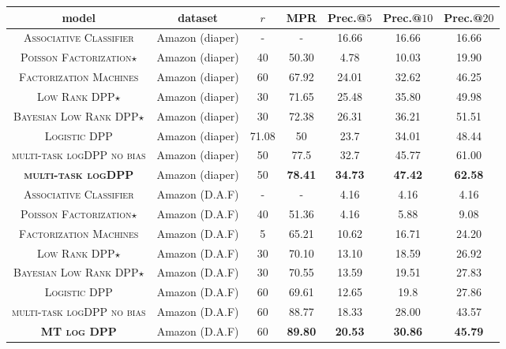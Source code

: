 \begin{table*}
\begin{center}
\begin{tabular}{ccccccc}
\hline
model & dataset & $r$ & MPR & Prec.@$5$ & Prec.@$10$ & Prec.@$20$ \\ \hline
\textsc{Associative Classifier} & Amazon (diaper) & - & - & 16.66 & 16.66 & 16.66 \\
\textsc{Poisson Factorization}$\star$ & Amazon (diaper) & 40 & 50.30 & 4.78 & 10.03 & 19.90 \\
\textsc{Factorization Machines} & Amazon (diaper) & 60 & 67.92 & 24.01 & 32.62 & 46.25 \\
\textsc{Low Rank DPP}$\star$ & Amazon (diaper) & 30 & 71.65 & 25.48 & 35.80 & 49.98 \\
\textsc{Bayesian Low Rank DPP}$\star$ & Amazon (diaper) & 30 & 72.38 & 26.31 & 36.21 & 51.51 \\
\textsc{Logistic DPP} & Amazon (diaper) & 71.08 & 50 & 23.7 & 34.01 & 48.44 \\ 
\textsc{multi-task logDPP no bias} & Amazon (diaper) & 50 & 77.5 & 32.7 & 45.77 & 61.00 \\ 
\textbf{\textsc{multi-task logDPP}} & Amazon (diaper) & 50 & \textbf{78.41} & \textbf{34.73} & \textbf{47.42} & \textbf{62.58} \\ \hline

\textsc{Associative Classifier} & Amazon (D.A.F) & - & - & 4.16 & 4.16 & 4.16 \\
\textsc{Poisson Factorization}$\star$ & Amazon (D.A.F) & 40 & 51.36 & 4.16 & 5.88 & 9.08 \\
\textsc{Factorization Machines} & Amazon (D.A.F) & 5 & 65.21 & 10.62 & 16.71 & 24.20 \\
\textsc{Low Rank DPP}$\star$ & Amazon (D.A.F) & 30 & 70.10 & 13.10 & 18.59 & 26.92 \\
\textsc{Bayesian Low Rank DPP}$\star$ & Amazon (D.A.F) & 30 & 70.55 & 13.59 & 19.51 & 27.83 \\
\textsc{Logistic DPP} & Amazon (D.A.F) & 60 & 69.61 & 12.65 & 19.8 & 27.86 \\ 
\textsc{multi-task logDPP no bias} & Amazon (D.A.F) & 60 & 88.77 & 18.33 & 28.00 & 43.57 \\ 
\textbf{\textsc{MT log DPP}} & Amazon (D.A.F) & 60 & \textbf{89.80} & \textbf{20.53} & \textbf{30.86} & \textbf{45.79} \\ \hline


\end{tabular}
\end{center}
\end{table*}
